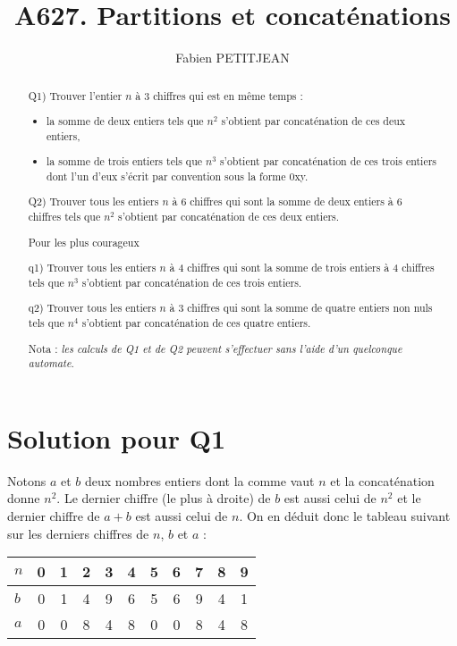 \documentclass[10pt,a4paper,twocolumn]{article}
\author{Fabien PETITJEAN}
\title{A627. Partitions et concaténations}
\begin{document}
\maketitle
\begin{abstract}
Q1) Trouver l’entier $n$ à 3 chiffres qui est en même temps :
\begin{itemize}
\item la somme de deux entiers tels que $n^2$ s’obtient par concaténation de ces deux entiers,
\item la somme de trois entiers tels que $n^3$ s’obtient par concaténation de ces trois entiers dont l’un d’eux s’écrit par convention sous la forme 0xy.
\end{itemize}

Q2) Trouver tous les entiers $n$ à 6 chiffres qui sont la somme de deux entiers à 6 chiffres tels que $n^2$ s’obtient par concaténation de ces deux entiers.

Pour les plus courageux

q1) Trouver tous les entiers $n$ à 4 chiffres qui sont la somme de trois entiers à 4 chiffres tels que $n^3$ s’obtient par concaténation de ces trois entiers.

q2) Trouver tous les entiers $n$ à 3 chiffres qui sont la somme de quatre entiers  non nuls  tels que $n^4$ s’obtient par concaténation de ces quatre entiers.

Nota : {\it les calculs de Q1 et de Q2  peuvent s’effectuer sans l’aide d’un quelconque automate}.
\end{abstract}

\section{Solution pour Q1}

Notons $a$ et $b$ deux nombres entiers dont la comme vaut $n$ et la concaténation donne $n^2$. Le dernier chiffre (le plus à droite) de $b$ est aussi celui de $n^2$ et le dernier chiffre de $a+b$ est aussi celui de $n$. On en déduit donc le tableau suivant sur les derniers chiffres de $n$, $b$ et $a$ :

\begin{tabular}{|l|c|c|c|c|c|c|c|c|c|c|}
\hline
$n$ & 0 & 1 & 2 & 3 & 4 & 5 & 6 & 7 & 8 & 9 \\
\hline
$b$ & 0 & 1 & 4 & 9 & 6 & 5 & 6 & 9 & 4 & 1 \\
\hline
$a$ & 0 & 0 & 8 & 4 & 8 & 0 & 0 & 8 & 4 & 8 \\
\hline
\end{tabular}
\end{document}
